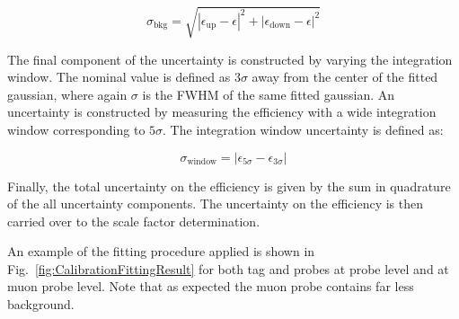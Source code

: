 \begin{equation}
  \sigma_{\text{bkg}} = \sqrt{|\epsilon_{\text{up}}-\epsilon|^{2}+|\epsilon_{\text{down}}-\epsilon|^{2}}
\end{equation}

The final component of the uncertainty is constructed by varying the integration window. The nominal value is defined as $3\sigma$ away from the center of the fitted gaussian, where again $\sigma$ is the FWHM of the same fitted gaussian. An uncertainty is constructed by measuring the efficiency with a wide integration window corresponding to $5\sigma$. The integration window uncertainty is defined as:

\begin{equation}
  \sigma_{\text{window}} = |\epsilon_{5\sigma}-\epsilon_{3\sigma}|
\end{equation}

Finally, the total uncertainty on the efficiency is given by the sum in quadrature of the all uncertainty components. The uncertainty on the efficiency is then carried over to the scale factor determination.

An example of the fitting procedure applied is shown in Fig.~\ref{fig:CalibrationFittingResult} for both tag and probes at probe level and at muon probe level. Note that as expected the muon probe contains far less background.


